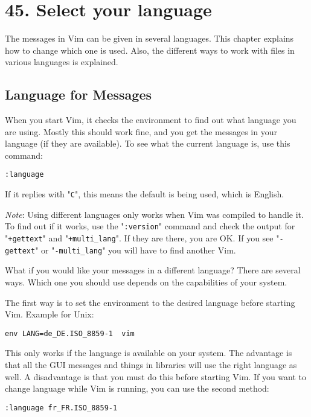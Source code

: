 \section{45. Select your language}
The messages in Vim can be given in several languages.
This chapter explains how to change which one is used.
Also, the different ways to work with files in various languages is explained.
\subsection{Language for Messages}
When you start Vim, it checks the environment to find out what language you are using.
Mostly this should work fine, and you get the messages in your language (if they are available).
To see what the current language is, use this command:

\begin{Verbatim}[samepage=true]
 :language
\end{Verbatim}

If it replies with "\verb!C!", this means the default is being used, which is English.

\emph{Note}:
Using different languages only works when Vim was compiled to handle it.
To find out if it works, use the "\verb!:version!" command and check the output for "\verb!+gettext!" and "\verb!+multi_lang!".
If they are there, you are OK.
If you see "\verb!-gettext!" or "\verb!-multi_lang!" you will have to find another Vim.

What if you would like your messages in a different language?  There are several ways.
Which one you should use depends on the capabilities of your system.

The first way is to set the environment to the desired language before starting Vim.
Example for Unix:

\begin{Verbatim}[samepage=true]
 env LANG=de_DE.ISO_8859-1  vim
\end{Verbatim}

This only works if the language is available on your system.
The advantage is that all the GUI messages and things in libraries will use the right language as well.
A disadvantage is that you must do this before starting Vim.
If you want to change language while Vim is running, you can use the second method:

\begin{Verbatim}[samepage=true]
 :language fr_FR.ISO_8859-1
\end{Verbatim}

